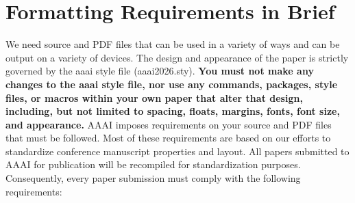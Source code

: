 \documentclass[letterpaper]{article} %
\begin{document}
\section{Formatting Requirements in Brief}
We need source and PDF files that can be used in a variety of ways and can be output on a variety of devices. The design and appearance of the paper is strictly governed by the aaai style file (aaai2026.sty).
\textbf{You must not make any changes to the aaai style file, nor use any commands, packages, style files, or macros within your own paper that alter that design, including, but not limited to spacing, floats, margins, fonts, font size, and appearance.} AAAI imposes requirements on your source and PDF files that must be followed. Most of these requirements are based on our efforts to standardize conference manuscript properties and layout. All papers submitted to AAAI for publication will be recompiled for standardization purposes. Consequently, every paper submission must comply with the following requirements:
\end{document}
